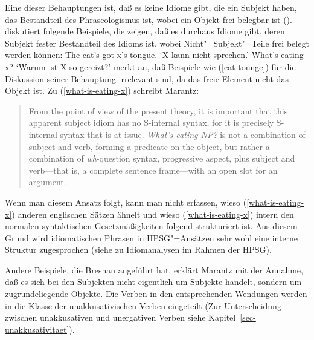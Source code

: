 %
Eine dieser Behauptungen ist, daß es keine Idiome gibt, die ein Subjekt haben, das Bestandteil des
Phraseologismus ist, wobei ein Objekt frei belegbar ist (\citealp[--51]{Marantz81a-u}).
\citet[--350]{Bresnan82c} diskutiert folgende Beispiele, die zeigen, daß es durchaus
Idiome gibt, deren Subjekt fester Bestandteil des Idioms ist, wobei Nicht"=Subjekt"=Teile
frei belegt werden können:
\eal
\ex\label{cat-tounge}
The cat's got x's tongue.
\glt `X kann nicht sprechen.'
\ex\label{what-is-eating-x}
What's eating x?
\glt `Warum ist X so gereizt?'
\zl
\citet[]{Marantz84a} merkt an, daß Beispiele wie (\ref{cat-tounge}) für die Diskussion seiner
Behauptung irrelevant sind, da das freie Element nicht das Objekt ist. Zu (\ref{what-is-eating-x}) schreibt
Marantz:
\begin{quote}
From the point of view of the present theory, it is important that this apparent subject idiom
has no S-internal syntax, for it is precisely S-internal syntax that is at issue. \emph{What's eating NP?}
is not a combination of subject and verb, forming a predicate on the object, but rather a combination of \emph{wh}-question
syntax, progressive aspect, plus subject and verb---that is, a complete sentence frame---with an open slot
for an argument. \citep[]{Marantz84a}
\end{quote}
Wenn man diesem Ansatz folgt, kann man nicht erfassen, wieso (\ref{what-is-eating-x}) anderen englischen
Sätzen ähnelt und wieso (\ref{what-is-eating-x}) intern den normalen syntaktischen Gesetzmäßigkeiten folgend strukturiert ist.
Aus diesem Grund wird idiomatischen Phrasen in HPSG"=Ansätzen sehr wohl eine interne Struktur zugesprochen 
(siehe  zu Idiomanalysen im Rahmen der HPSG). 

Andere Beispiele, die Bresnan angeführt hat, erklärt Marantz mit der Annahme, daß es sich bei
den Subjekten nicht eigentlich um Subjekte handelt, sondern um zugrundeliegende Objekte. Die
Verben in den entsprechenden Wendungen werden in die Klasse der unakkusativischen Verben eingeteilt
(Zur Unterscheidung zwischen unakkusativen und unergativen Verben siehe Kapitel~\ref{sec-unakkusativitaet}).

